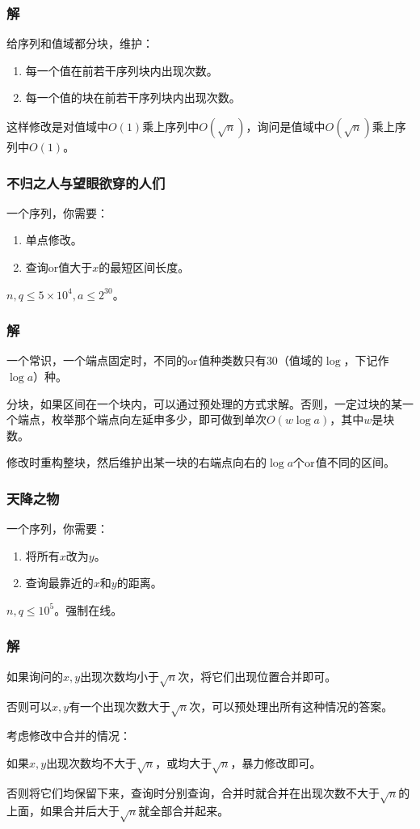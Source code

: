 \documentclass[10pt]{beamer}
\begin{document}
	\begin{frame}
		\frametitle{解}
	
		给序列和值域都分块，维护：

		\begin{enumerate}
			\item 每一个值在前若干序列块内出现次数。
			\item 每一个值的块在前若干序列块内出现次数。
		\end{enumerate}

		这样修改是对值域中$O(1)$乘上序列中$O(\sqrt n)$，询问是值域中$O(\sqrt n)$乘上序列中$O(1)$。
	
	\end{frame}
	\begin{frame}
		\frametitle{不归之人与望眼欲穿的人们}
	
		一个序列，你需要：

		\begin{enumerate}
			\item 单点修改。
			\item 查询$\mathrm{or}$值大于$x$的最短区间长度。
		\end{enumerate}

		$n,q\le 5\times 10^4,a\le 2^{30}$。
	
	\end{frame}
	\begin{frame}
		\frametitle{解}
	
		一个常识，一个端点固定时，不同的$\rm or$值种类数只有$30$（值域的$\log$，下记作$\log a$）种。

		分块，如果区间在一个块内，可以通过预处理的方式求解。否则，一定过块的某一个端点，枚举那个端点向左延申多少，即可做到单次$O(w\log a)$，其中$w$是块数。

		修改时重构整块，然后维护出某一块的右端点向右的$\log a$个$\rm or$值不同的区间。
	
	\end{frame}
	\begin{frame}
		\frametitle{天降之物}
	
		一个序列，你需要：

		\begin{enumerate}
			\item 将所有$x$改为$y$。
			\item 查询最靠近的$x$和$y$的距离。
		\end{enumerate}

		$n,q\le 10^5$。强制在线。
	
	\end{frame}
	\begin{frame}
		\frametitle{解}
	
		如果询问的$x,y$出现次数均小于$\sqrt n$次，将它们出现位置合并即可。

		否则可以$x,y$有一个出现次数大于$\sqrt n$次，可以预处理出所有这种情况的答案。

		考虑修改中合并的情况：

		如果$x,y$出现次数均不大于$\sqrt n$，或均大于$\sqrt n$，暴力修改即可。

		否则将它们均保留下来，查询时分别查询，合并时就合并在出现次数不大于$\sqrt n$的上面，如果合并后大于$\sqrt n$就全部合并起来。
	
	\end{frame}
\end{document}
